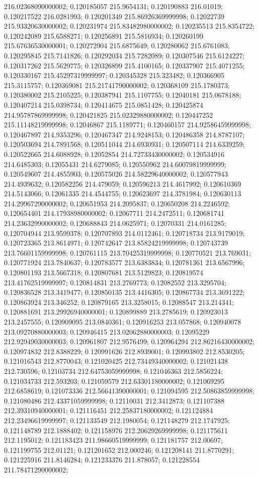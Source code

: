 216.02368090000002; 0.120185057 215.9654131; 0.120190883 216.01019; 0.120217522 216.0281993; 0.120201349 215.86926369999998; 0.12022739 215.93320630000002; 0.120231974 215.83482980000002; 0.120235513 215.8354722; 0.120242089 215.6588271; 0.120256891 215.5816934; 0.120260199 215.67636530000001; 0.120272904 215.6875649; 0.120280062 215.6761083; 0.120295845 215.7141826; 0.120292034 215.7282089; 0.120307546 215.6124227; 0.120317262 215.5629775; 0.120326899 215.4100165; 0.120337907 215.4071255; 0.120330167 215.45297319999997; 0.120345328 215.323482; 0.120366905 215.3115757; 0.120369081 215.21741790000002; 0.120368109 215.1780373; 0.120380002 215.2105225; 0.120387941 215.1107755; 0.12040181 215.0678188; 0.120407214 215.0398734; 0.120414675 215.0851428; 0.120425874 214.95787869999998; 0.120421825 215.02329880000002; 0.120447252 215.11148219999998; 0.12046867 215.1189771; 0.120460157 214.92586459999998; 0.120467897 214.9353296; 0.120467347 214.9248153; 0.120486358 214.8787107; 0.120503694 214.7891568; 0.120511044 214.6930931; 0.120507114 214.6339259; 0.120522665 214.6088928; 0.12052854 214.72733430000002; 0.120534916 214.6485303; 0.12055431 214.6279085; 0.120550962 214.60079819999999; 0.120549607 214.4855903; 0.120575026 214.58229640000002; 0.120577943 214.4939632; 0.120582256 214.479059; 0.120596213 214.4617992; 0.120610369 214.5143066; 0.12061335 214.4544755; 0.120623697 214.3781984; 0.120630113 214.29967290000002; 0.120651953 214.2095837; 0.120650208 214.2246592; 0.120654401 214.17938980000002; 0.12067711 214.2472511; 0.120681741 214.23632990000002; 0.120688843 214.0625971; 0.12070331 214.0161285; 0.120704944 213.9599378; 0.120707893 214.0112461; 0.120718734 213.9179019; 0.120723365 213.8614971; 0.120742647 213.85824219999998; 0.120743739 213.76601159999998; 0.120761115 213.70425319999998; 0.120770521 213.769031; 0.120771924 213.7840637; 0.120783577 213.6383834; 0.120781361 213.6567996; 0.120801193 213.5667318; 0.120807681 213.5129823; 0.120819574 213.41762519999997; 0.120814831 213.2769773; 0.12082552 213.3295704; 0.120836528 213.3419477; 0.120850135 213.4416305; 0.120867734 213.3691222; 0.120863924 213.346252; 0.120879165 213.3258015; 0.12088547 213.214341; 0.120881691 213.29926940000001; 0.120899889 213.2785619; 0.120923013 213.2457555; 0.120909095 213.0840361; 0.120916253 213.057868; 0.120940078 213.09270880000003; 0.120946415 213.02062880000003; 0.12095229 212.92949030000003; 0.120961807 212.9576499; 0.120964294 212.86216430000002; 0.120974832 212.8388229; 0.120991626 212.8939001; 0.120993802 212.8530205; 0.121016543 212.8770043; 0.121020425 212.73449340000002; 0.121021438 212.730596; 0.12103734 212.64753059999998; 0.121046363 212.5856224; 0.121034733 212.593203; 0.121059579 212.63301180000002; 0.121069295 212.6858619; 0.121073336 212.56641390000001; 0.121094595 212.50863859999998; 0.121080486 212.43371059999998; 0.12110031 212.3412873; 0.121107388 212.39310940000001; 0.121116451 212.25837180000002; 0.121124884 212.23496619999997; 0.121133549 212.1980054; 0.121148279 212.1747925; 0.121148789 212.1888402; 0.121158976 212.20629269999998; 0.121175611 212.1195012; 0.121183423 211.98660519999999; 0.121181757 212.00697; 0.121199755 212.01121; 0.121201652 212.000246; 0.121208141 211.8770291; 0.121225916 211.8146284; 0.121233376 211.878057; 0.121228554 211.78471290000002; 